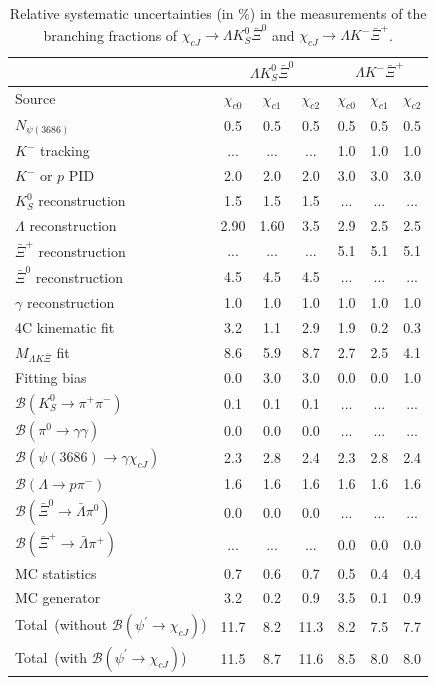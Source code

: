 \documentclass[amsmath,amssymb,twocolumn,prd,floatfix,showpacs,nofootinbib]{revtex4-1}
\begin{document}
\begin{table}[htbp]
	\centering
	\caption{Relative systematic uncertainties (in \%) in the measurements of the branching fractions of $\chi_{cJ} \to \Lambda K^0_S \bar \Xi^0$ and $\chi_{cJ} \to \Lambda K^- \bar \Xi^+$.}
	\begin{tabular}{lcccccc}
		\hline\hline
		&\multicolumn{3}{c}{$\Lambda K^0_S \bar \Xi^0$}&\multicolumn{3}{c}{$\Lambda K^- \bar \Xi^+$} \\ \hline
		Source & $\chi_{c0}$ & $\chi_{c1}$ & $\chi_{c2}$ & $\chi_{c0}$ & $\chi_{c1}$ & $\chi_{c2}$ \\ \hline
		$N_{\psi(3686)}$ & 0.5 & 0.5 & 0.5 & 0.5 & 0.5 & 0.5\\
		$K^-$ tracking & ... & ... & ... & 1.0 & 1.0 & 1.0\\
		$K^-$ or $p$ PID & 2.0 & 2.0 & 2.0 & 3.0 & 3.0 & 3.0 \\
		$K_{S}^{0}$ reconstruction & 1.5 & 1.5 & 1.5 & ... & ... & ...\\
		$\Lambda$ reconstruction & 2.90 & 1.60 & 3.5 & 2.9 & 2.5 & 2.5\\
		$\bar\Xi^+$ reconstruction & ... & ... & ... & 5.1 & 5.1 & 5.1 \\
		$\bar\Xi^0$ reconstruction & 4.5 & 4.5 & 4.5 & ... & ... & ... \\
		$\gamma$ reconstruction & 1.0 & 1.0 & 1.0 & 1.0 & 1.0 & 1.0 \\
		4C kinematic fit & 3.2 & 1.1 & 2.9 & 1.9 & 0.2  & 0.3\\
		$M_{\Lambda K \bar \Xi}$ fit  & 8.6 & 5.9 & 8.7 & 2.7 & 2.5 & 4.1\\
		Fitting bias & 0.0 & 3.0 & 3.0 & 0.0 & 0.0  & 1.0\\
		$\mathcal B(K_{S}^{0} \to \pi^{+} \pi^{-})$ & 0.1 & 0.1 & 0.1 & ... & ... & ...\\
		$\mathcal B(\pi^0 \to \gamma\gamma )$ & 0.0 & 0.0 & 0.0 & ... & ... & ...\\
		$\mathcal B(\psi(3686)\to \gamma \chi_{cJ})$ & 2.3 & 2.8 & 2.4 & 2.3 & 2.8 & 2.4 \\
		$\mathcal B(\Lambda \to p\pi^-)$ & 1.6 & 1.6 & 1.6  & 1.6 & 1.6 & 1.6 \\
		$\mathcal B(\bar \Xi^0\to \bar \Lambda\pi^0)$ & 0.0 & 0.0 & 0.0 & ... & ... & ...\\
		$\mathcal B(\bar \Xi^+\to \bar \Lambda\pi^+)$ & ... & ... & ... & 0.0 & 0.0 & 0.0 \\
		MC statistics & 0.7 & 0.6 & 0.7 & 0.5 & 0.4 & 0.4 \\
		MC generator  & 3.2 & 0.2 & 0.9 & 3.5 & 0.1 & 0.9\\
		Total~(without $\mathcal B(\psi^{'} \to \chi_{cJ})$)  & 11.7 & 8.2 & 11.3 & 8.2 & 7.5 & 7.7\\
		Total~(with $\mathcal B(\psi^{'} \to \chi_{cJ})$)  & 11.5 & 8.7 & 11.6 & 8.5 & 8.0 & 8.0\\
		\hline\hline
	\end{tabular}
	\label{tab:systematic}
\end{table}
\end{document}
